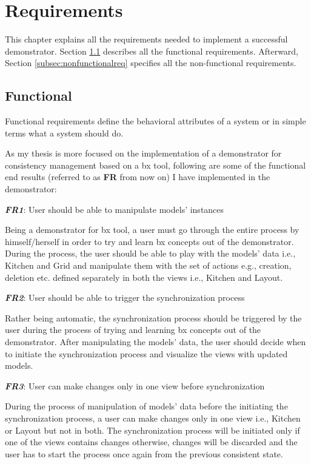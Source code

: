 \section{Requirements}\label{sec:requirements}
This chapter explains all the requirements needed to implement a successful demonstrator. Section \ref{subsec:functionalreq} describes all the functional requirements. Afterward, Section \ref{subsec:nonfunctionalreq} specifies all the non-functional requirements. 

\subsection{Functional}\label{subsec:functionalreq}
Functional requirements define the behavioral attributes of a system \cite{funcandnonfuncreq} or in simple terms what a system should do.

As my thesis is more focused on the implementation of a demonstrator for consistency management based on a bx tool, following are some of the functional end results (referred to as \textbf{FR} from now on) I have implemented in the demonstrator:

\textbf{\textit{FR1}}: User should be able to manipulate models' instances

Being a demonstrator for bx tool, a user must go through the entire process by himself/herself in order to try and learn bx concepts out of the demonstrator. During the process, the user should be able to play with the models' data i.e., Kitchen and Grid and manipulate them with the set of actions e.g., creation, deletion etc. defined separately in both the views i.e., Kitchen and Layout.

\textbf{\textit{FR2}}: User should be able to trigger the synchronization process

Rather being automatic, the synchronization process should be triggered by the user during the process of trying and learning bx concepts out of the demonstrator. After manipulating the models' data, the user should decide when to initiate the synchronization process and visualize the views with updated models.

\textbf{\textit{FR3}}: User can make changes only in one view before synchronization

During the process of manipulation of models' data before the initiating the synchronization process, a user can make changes only in one view i.e., Kitchen or Layout but not in both. The synchronization process will be initiated only if one of the views contains changes otherwise, changes will be discarded and the user has to start the process once again from the previous consistent state.

